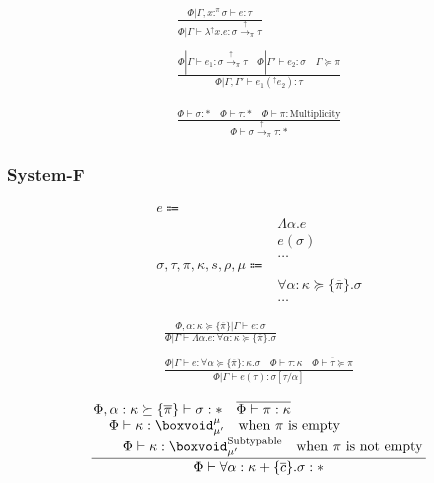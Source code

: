 \documentclass {article}
\begin{document}
\begin{gather*}
\frac
{\Phi | \Gamma, x :^\pi \sigma \vdash e : \tau}
{\Phi | \Gamma \vdash \lambda^\uparrow x. e : \sigma \xrightarrow{\uparrow}_\pi \tau } \\
\\
\frac
{\Phi | \Gamma \vdash e_1 : \sigma \xrightarrow{\uparrow}_\pi \tau \quad \Phi | \Gamma' \vdash e_2 : \sigma \quad \Gamma \succeq \pi}
{\Phi | \Gamma, \Gamma' \vdash e_1(^\uparrow e_2) : \tau}
\end{gather*}

\begin{gather*}
\frac
{\Phi \vdash \sigma : * \quad \Phi \vdash \tau : * \quad \Phi \vdash \pi : \text{Multiplicity}}
{\Phi \vdash \sigma \xrightarrow{\uparrow}_\pi \tau  : * }
\end{gather*}

\subsubsection{System-F}
\begin{align*}
e \Coloneqq & \\
& \Lambda \alpha. e \tag{Type Lambda} \\
& e (\sigma) \tag{Type Application} \\
& \dots \\
\sigma, \tau, \pi, \kappa, s, \rho, \mu \Coloneqq & \\
& \forall \alpha : \kappa \succeq \{ \overline \pi \}. \sigma \tag{Type Poly}\\ 
& \dots
\end{align*}

\begin{gather*}
\frac
{\Phi, \alpha : \kappa  \succeq \{ \overline \pi \} | \Gamma \vdash e : \sigma}
{\Phi | \Gamma \vdash \Lambda \alpha. e : \forall \alpha : \kappa \succeq \{ \overline \pi \} . \sigma } \\
\\
\frac
{\Phi | \Gamma \vdash e : \forall \alpha \succeq \{ \overline \pi \} : \kappa. \sigma \quad \Phi \vdash \tau : \kappa\quad \overline { \Phi \vdash \tau \succeq \pi }}
{\Phi | \Gamma \vdash e (\tau) : \sigma [\tau/\alpha] }
\end{gather*}

\begin{gather*}
\frac
{\splitfrac{\Phi, \alpha : \kappa \succeq \{ \overline \pi \}\vdash \sigma : * \quad \overline { \Phi \vdash \pi : \kappa}}
{\splitfrac{\Phi \vdash \kappa : \boxvoid^\mu_{\mu'} \quad \text{when $ \pi $ is empty}}
{\Phi \vdash \kappa : \boxvoid^\text{Subtypable}_{\mu'} \quad \text{when $ \pi $ is not empty} }}}
{\Phi \vdash \forall \alpha : \kappa + \{ \overline c \}. \sigma : * } \\
\end{gather*}
\end{document}
